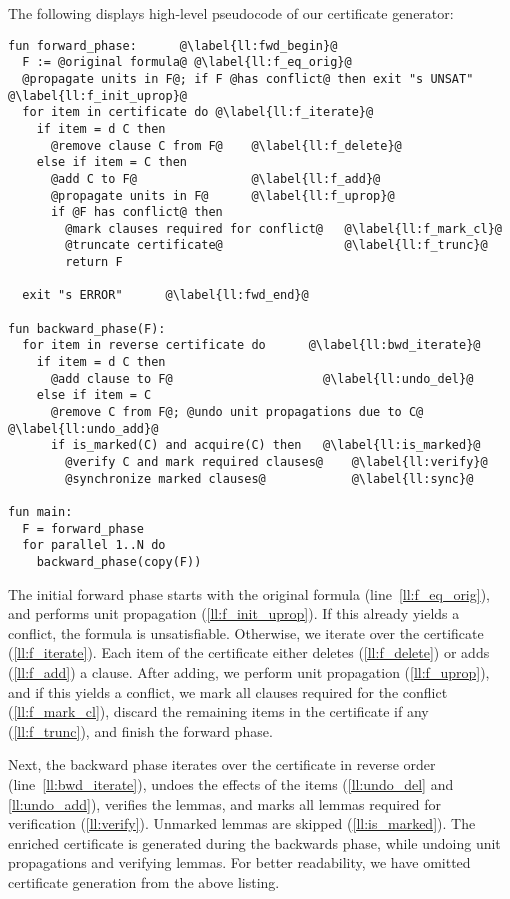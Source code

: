 \documentclass[smallcondensed]{svjour3}     %
\makeatletter
\newcommand{\withlinenumbers}{%
  \lstset{numbers=left,numberstyle=\scriptsize,xleftmargin=2em,numberblanklines=false,countblanklines=false,escapechar=@}%
}
\makeatother
\begin{document}
The following displays high-level pseudocode of our certificate generator:

{\withlinenumbers\small
\begin{lstlisting}[language=pseudo]
fun forward_phase:      @\label{ll:fwd_begin}@
  F := @original formula@ @\label{ll:f_eq_orig}@
  @propagate units in F@; if F @has conflict@ then exit "s UNSAT"  @\label{ll:f_init_uprop}@
  for item in certificate do @\label{ll:f_iterate}@
    if item = d C then 
      @remove clause C from F@    @\label{ll:f_delete}@
    else if item = C then
      @add C to F@                @\label{ll:f_add}@
      @propagate units in F@      @\label{ll:f_uprop}@
      if @F has conflict@ then
        @mark clauses required for conflict@   @\label{ll:f_mark_cl}@
        @truncate certificate@                 @\label{ll:f_trunc}@   
        return F

  exit "s ERROR"      @\label{ll:fwd_end}@

fun backward_phase(F):
  for item in reverse certificate do      @\label{ll:bwd_iterate}@
    if item = d C then
      @add clause to F@                     @\label{ll:undo_del}@
    else if item = C
      @remove C from F@; @undo unit propagations due to C@  @\label{ll:undo_add}@
      if is_marked(C) and acquire(C) then   @\label{ll:is_marked}@  
        @verify C and mark required clauses@    @\label{ll:verify}@
        @synchronize marked clauses@            @\label{ll:sync}@
        
fun main:
  F = forward_phase
  for parallel 1..N do
    backward_phase(copy(F))
\end{lstlisting}
}

The initial forward phase starts with the original formula (line~\ref{ll:f_eq_orig}), and performs unit propagation (\ref{ll:f_init_uprop}). 
If this already yields a conflict, the formula is unsatisfiable. Otherwise, we iterate over the certificate (\ref{ll:f_iterate}). Each item of the certificate either
deletes (\ref{ll:f_delete}) or adds (\ref{ll:f_add}) a clause. After adding, we perform unit propagation (\ref{ll:f_uprop}), and if this yields a conflict,
we mark all clauses required for the conflict (\ref{ll:f_mark_cl}), discard the remaining items in the certificate if any (\ref{ll:f_trunc}), and finish the forward phase.

Next, the backward phase iterates over the certificate in reverse order (line~\ref{ll:bwd_iterate}), undoes the effects of the items (\ref{ll:undo_del} and \ref{ll:undo_add}), verifies the lemmas, and marks all lemmas required for verification (\ref{ll:verify}). Unmarked lemmas are skipped (\ref{ll:is_marked}).
The enriched certificate is generated during the backwards phase, while undoing unit propagations and verifying lemmas. 
For better readability, we have omitted certificate generation from the above listing.
\end{document}
